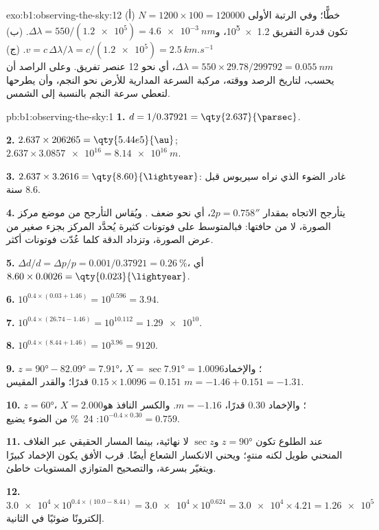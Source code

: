 \begin{solution}{exo:b1:observing-the-sky:12}
(أ) $N = 1200\times100 = \num{120000}$ خطًّا؛ وفي الرتبة الأولى تكون
قدرة التفريق \num{1.2e5}، و$\Delta\lambda = 550/(\num{1.2e5}) =
\qty{4.6e-3}{nm}$. (ب) $v = c\,\Delta\lambda/\lambda = c/(\num{1.2e5}) =
\qty{2.5}{km.s^{-1}}$. (ج) $\Delta\lambda = 550\times29.78/\num{299792} =
\qty{0.055}{nm}$، أي نحو 12 عنصر تفريق. وعلى الراصد أن يحسب،
لتاريخ الرصد ووقته، مركبة السرعة المدارية للأرض نحو النجم،
وأن يطرحها لتعطي سرعة النجم بالنسبة إلى الشمس.
\end{solution}

\begin{solution}{pb:b1:observing-the-sky:1}
\textbf{1.} $d = 1/0.37921 = \qty{2.637}{\parsec}$.

\textbf{2.} $2.637\times206265 = \qty{5.44e5}{\au}$;
$2.637\times\num{3.0857e16} = \qty{8.14e16}{m}$.

\textbf{3.} $2.637\times3.2616 = \qty{8.60}{\lightyear}$: غادر الضوء الذي نراه سيريوس قبل 8.6 سنة.

\textbf{4.} يتأرجح الاتجاه بمقدار $2p = \ang{;;0.758}$، أي نحو ضعف . ويُقاس التأرجح من موضع مركز الصورة، لا من حافتها: فبالمتوسط على فوتونات كثيرة يُحدَّد المركز بجزء صغير من عرض الصورة، وتزداد الدقة كلما عُدّت فوتونات أكثر.

\textbf{5.} $\Delta d/d = \Delta p/p = 0.001/0.37921 = \qty{0.26}{\percent}$،
أي $8.60\times0.0026 = \qty{0.023}{\lightyear}$.

\textbf{6.} $10^{0.4\times(0.03 + 1.46)} = 10^{0.596} = 3.94$.

\textbf{7.} $10^{0.4\times(26.74 - 1.46)} = 10^{10.112} = \num{1.29e10}$.

\textbf{8.} $10^{0.4\times(8.44 + 1.46)} = 10^{3.96} = \num{9120}$.

\textbf{9.} $z = \ang{90} - \ang{82.09} = \ang{7.91}$، $X = \sec\ang{7.91} =
1.0096$؛ والإخماد $0.15\times1.0096 = 0.151$ قدرًا؛ والقدر المقيس
$m = -1.46 + 0.151 = -1.31$.

\textbf{10.} $z = \ang{60}$، $X = 2.000$؛ والإخماد 0.30 قدرًا،
$m = -1.16$. والكسر النافذ هو $10^{-0.4\times0.30} = 0.759$:
\qty{24}{\percent} من الضوء يضيع.

\textbf{11.} عند الطلوع تكون $z = \ang{90}$ و$\sec z$ لا نهائية، بينما المسار الحقيقي عبر الغلاف المنحني طويل لكنه منتهٍ؛ ويحني الانكسار الشعاع أيضًا. قرب الأفق يكون الإخماد كبيرًا ويتغيّر بسرعة، والتصحيح المتوازي المستويات خاطئ.

\textbf{12.} $\num{3.0e4}\times10^{0.4\times(10.0 - 8.44)} = \num{3.0e4}
\times10^{0.624} = \num{3.0e4}\times4.21 = \num{1.26e5}$ إلكترونًا ضوئيًا في الثانية.


\end{solution}
